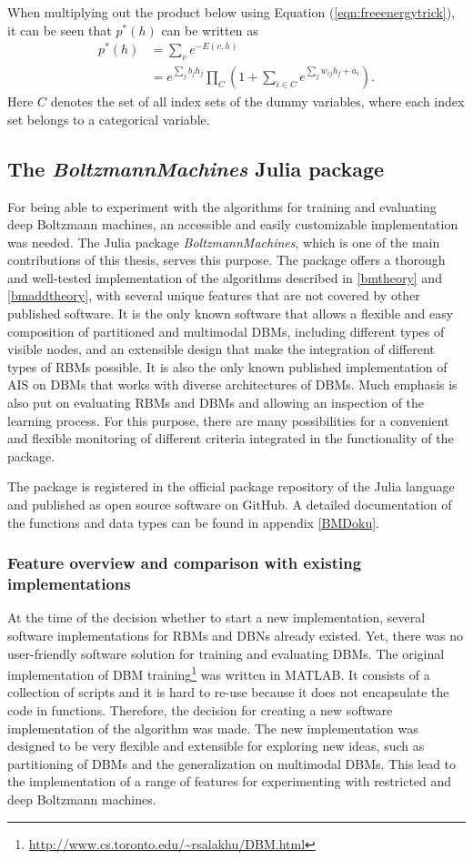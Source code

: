 \documentclass[12pt]{article}
\newcommand{\apkg}[1]{\emph{#1}}
\begin{document}
When multiplying out the product below using Equation (\ref{eqn:freeenergytrick}), it can be seen that $p^*(h)$ can be written as
\begin{align*}
p^*(h) &= \sum_v e^{-E(v,h)} \\
&= e^{\sum_j b_j h_j} \prod_{C} \left( 1 + \sum_{i \in C} e^{\sum_j w_{ij} h_j + a_i} \right).
\end{align*}
Here $C$ denotes the set of all index sets of the dummy variables, where each index set belongs to a categorical variable.

\subsection{The \apkg{BoltzmannMachines} Julia package}
For being able to experiment with the algorithms for training and evaluating deep Boltzmann machines, an accessible and easily customizable implementation was needed.
The Julia package \apkg{BoltzmannMachines}, which is one of the main contributions of this thesis, serves this purpose.
The package offers a thorough and well-tested implementation of the algorithms described in \ref{bmtheory} and \ref{bmaddtheory}, with several unique features that are not covered by other published software.
It is the only known software that allows a flexible and easy composition of partitioned and multimodal DBMs, including different types of visible nodes, and an extensible design that make the integration of different types of RBMs possible.
It is also the only known published implementation of AIS on DBMs that works with diverse architectures of DBMs.
Much emphasis is also put on evaluating RBMs and DBMs and allowing an inspection of the learning process.
For this purpose, there are many possibilities for a convenient and flexible monitoring of different criteria integrated in the functionality of the package.

The package is registered in the official package repository of the Julia language and published as open source software on GitHub.
A detailed documentation of the functions and data types can be found in appendix \ref{BMDoku}.


\subsubsection{Feature overview and comparison with existing implementations}\label{BMfeatures}

At the time of the decision whether to start a new implementation, several software implementations for RBMs and DBNs already existed.
Yet, there was no user-friendly software solution for training and evaluating DBMs.
The original implementation of DBM training\footnote{\url{http://www.cs.toronto.edu/~rsalakhu/DBM.html}} was written in MATLAB.
It consists of a collection of scripts and it is hard to re-use because it does not encapsulate the code in functions.
Therefore, the decision for creating a new software implementation of the algorithm was made.
The new implementation was designed to be very flexible and extensible for exploring new ideas, such as partitioning of DBMs and the generalization on multimodal DBMs.
This lead to the implementation of a range of features for experimenting with restricted and deep Boltzmann machines.
\end{document}
